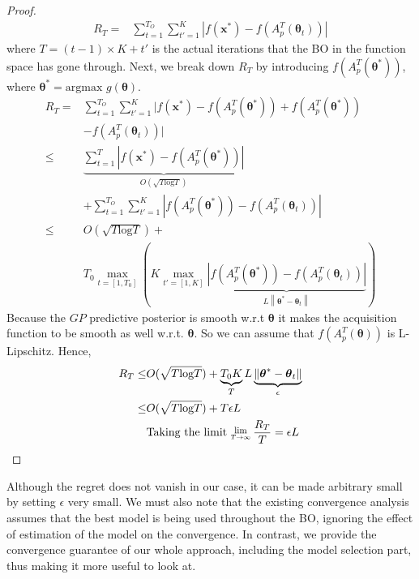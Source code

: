 \documentclass{article}
\newcommand{\Lim}[1]{\raisebox{0.5ex}{\scalebox{0.8}{$\displaystyle \lim_{#1}\;$}}}
\begin{document}
\begin{proof}
\begin{align*}
R_{T} = & \sum_{t=1}^{T_{O}}\sum_{t'=1}^{K}|f(\boldsymbol{x}^{*})-f(A_{p}^{T}(\boldsymbol{\theta}_{t}))|
\end{align*}
where $T=(t-1)\times K+t'$ is the actual iterations that the BO in the function space has gone through. Next, we break down $R_{T}$ by introducing $f(A_{p}^{T}(\boldsymbol{\theta}^{*}))$, where $\boldsymbol{\theta}^{*}=\text{argmax }g(\boldsymbol{\theta})$.
\begin{align*}
R_T= & \sum_{t=1}^{T_{O}}\sum_{t'=1}^{K} |f(\boldsymbol{x}^{*})-f(A_{p}^{T}(\boldsymbol{\theta}^{*})) +f(A_{p}^{T}(\boldsymbol{\theta}^{*}))\\
&-f(A_{p}^{T}(\boldsymbol{\theta}_t))|\\ 
\leq & \underbrace{\sum_{t=1}^{T}|f(\boldsymbol{x}^{*})-f(A_{p}^{T}(\boldsymbol{\theta}^{*}))|}_{O(\sqrt{T\text{log}T})}\\
&+\sum_{t=1}^{T_{O}}\sum_{t'=1}^{K} |f(A_{p}^{T}(\boldsymbol{\theta}^{*}))-f(A_{p}^{T}(\boldsymbol{\theta}_t))|\\ 
\leq & O(\sqrt{T\text{log}T})+\\
&T_{0} \operatorname*{max}_{t= [1,T_{0}]}(K \operatorname*{max}_{t'= [1,K]}\underbrace{|f(A_{p}^{T}(\boldsymbol{\theta}^{*}))-f(A_{p}^{T}(\boldsymbol{\theta}_t))|}_{L\left\|\boldsymbol{\theta}^{*}-\boldsymbol{\theta}_{t}\right\|})
\end{align*}
Because the $GP$ predictive posterior is smooth w.r.t $\boldsymbol{\theta}$ it makes the acquisition function to be smooth as well w.r.t. $\boldsymbol{\theta}$. So we can assume that $f(A_{p}^{T}(\boldsymbol{\theta}))$ is L-Lipschitz. Hence,
\begin{align*}
R_T\leq & O(\sqrt{T\text{log}T})+\underbrace{T_{0} K}_{T} L\underbrace{\left\|\boldsymbol{\theta}^{*}-\boldsymbol{\theta}_{t}\right\|}_{\epsilon} \\ 
\leq & O(\sqrt{T\text{log}T})+T \epsilon L \\ 
& \text{Taking the limit }\Lim{T \rightarrow \infty} \frac{R_{T}}{T} = \epsilon L
\end{align*}
\end{proof}
Although the regret does not vanish in our case, it can be made arbitrary small by setting $\epsilon$ very small. We must also note that the existing convergence analysis assumes that the best model is being used throughout the BO, ignoring the effect of estimation of the model on the convergence. In contrast, we provide the convergence guarantee of our whole approach, including the model selection part, thus making it more useful to look at.
\end{document}
